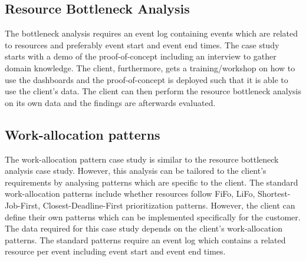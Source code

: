 
\subsection*{Resource Bottleneck Analysis}

The bottleneck analysis requires an event log containing events which are related to resources and preferably event start and event end times. The case study starts with a demo of the proof-of-concept including an interview to gather domain knowledge. The client, furthermore, gets a training/workshop on how to use the dashboards and the proof-of-concept is deployed such that it is able to use the client's data. The client can then perform the resource bottleneck analysis on its own data and the findings are afterwards evaluated. 







\subsection*{Work-allocation patterns}
The work-allocation pattern case study is similar to the resource bottleneck analysis case study. However, this analysis can be tailored to the client's requirements by analysing patterns which are specific to the client. The standard work-allocation patterns include whether resources follow FiFo, LiFo, Shortest-Job-First, Closest-Deadline-First prioritization patterns. However, the client can define their own patterns which can be implemented specifically for the customer.  The data required for this case study depends on the client's work-allocation patterns. The standard patterns require an event log which contains a related resource per event including event start and event end times. 

